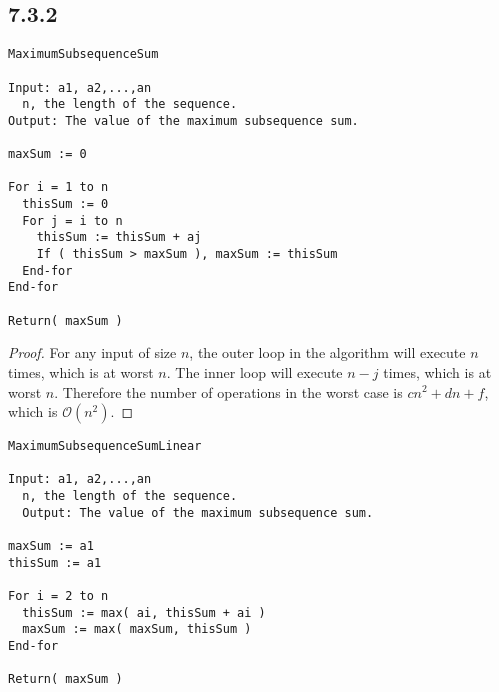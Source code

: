 \subsection*{7.3.2}
\begin{lstlisting}
MaximumSubsequenceSum

Input: a1, a2,...,an
  n, the length of the sequence.
Output: The value of the maximum subsequence sum.

maxSum := 0

For i = 1 to n
  thisSum := 0
  For j = i to n
    thisSum := thisSum + aj
    If ( thisSum > maxSum ), maxSum := thisSum
  End-for
End-for

Return( maxSum )
\end{lstlisting}
\begin{enumerate}
  \begin{proof}
    For any input of size $n$, the outer loop in the algorithm will execute $n$ times, which is at worst $n$. The inner loop will execute $n-j$ times, which is at worst $n$. Therefore the number of operations in the worst case is $cn^2 + dn + f$, which is $\mathcal{O}(n^2)$.
  \end{proof}
  \begin{lstlisting}
MaximumSubsequenceSumLinear

Input: a1, a2,...,an
  n, the length of the sequence.
  Output: The value of the maximum subsequence sum.

maxSum := a1
thisSum := a1

For i = 2 to n
  thisSum := max( ai, thisSum + ai )
  maxSum := max( maxSum, thisSum )
End-for

Return( maxSum )
  \end{lstlisting}
\end{enumerate}


